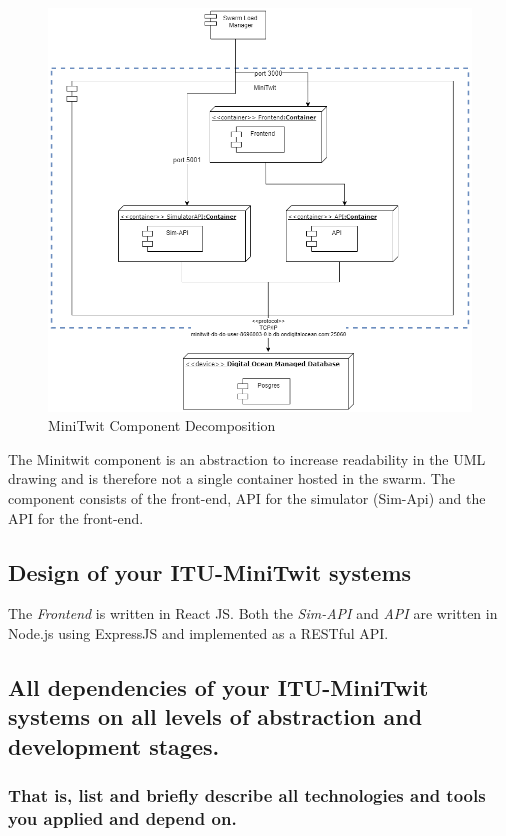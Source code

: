 \begin{figure}[h!]
    \centering
    \includegraphics[width=1\linewidth]{report/images/minitwit-decomposition.png}
    \caption{MiniTwit Component Decomposition}
    \label{fig:arcitechture-overview}
\end{figure}

The Minitwit component is an abstraction to increase readability in the UML drawing and is therefore not a single container hosted in the swarm. The component consists of the front-end, API for the simulator (Sim-Api) and the API for the front-end.

\subsection{Design of your ITU-MiniTwit systems}
The \textit{Frontend} is written in React JS. Both the \textit{Sim-API} and \textit{API} are written in Node.js using ExpressJS and implemented as a RESTful API. 

\subsection{All dependencies of your ITU-MiniTwit systems on all levels of abstraction and development stages.}
\subsubsection{That is, list and briefly describe all technologies
and tools you applied and depend on.}
